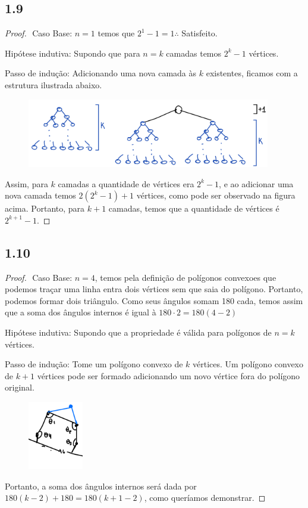 \documentclass{article}
\begin{document}
\subsection*{1.9}
\begin{proof}
$ $\newline
Caso Base: $n = 1$ temos que $2^1 - 1 = 1 \therefore$ Satisfeito.

Hipótese indutiva: Supondo que para $n = k$ camadas temos $2^k -1$ vértices.

Passo de indução: Adicionando uma nova camada às $k$ existentes, ficamos com a estrutura ilustrada abaixo.
  \begin{figure}[!h]
  \centering
  \includegraphics[height=3cm]{Q1_9.png}
  \end{figure}


Assim, para $k$ camadas a quantidade de vértices era $2^k -1$, e ao adicionar uma nova camada temos
$2(2^k - 1)+1$ vértices, como pode ser observado na figura acima. Portanto, para $k+1$ camadas, temos
que a quantidade de vértices é $2^{k+1} - 1$.

\end{proof}

\subsection*{1.10}
\begin{proof}
$ $\newline
Caso Base: $n =4$, temos pela definição de polígonos convexoes que podemos traçar uma linha entra dois
vértices sem que saia do polígono. Portanto, podemos formar dois triângulo. Como seus ângulos somam 180
cada, temos assim que a soma dos ângulos internos é igual à $180\cdot 2 = 180(4-2)$

Hipótese indutiva: Supondo que a propriedade é válida para polígonos de $n=k$ vértices.

Passo de indução: Tome um polígono convexo de $k$ vértices. Um polígono convexo de $k+1$ vértices pode ser
formado adicionando um novo vértice fora do polígono original.
  \begin{figure}[!h]
  \centering
  \includegraphics[height=3cm]{Q1_10.png}
  \end{figure}

Portanto, a soma dos ângulos internos será dada por $180(k-2)+180 = 180(k+1 -2)$, como queríamos demonstrar.
\end{proof}
\end{document}
